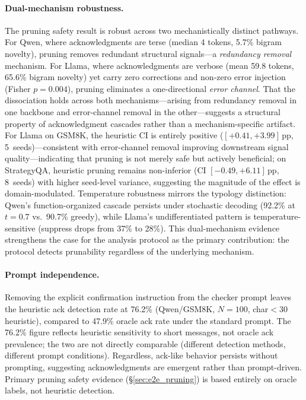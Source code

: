 \paragraph{Dual-mechanism robustness.}
The pruning safety result is robust across two mechanistically distinct pathways. For Qwen, where acknowledgments are terse (median 4 tokens, 5.7\% bigram novelty), pruning removes redundant structural signals---a \emph{redundancy removal} mechanism. For Llama, where acknowledgments are verbose (mean 59.8 tokens, 65.6\% bigram novelty) yet carry zero corrections and non-zero error injection (Fisher $p = 0.004$), pruning eliminates a one-directional \emph{error channel}. That the dissociation holds across both mechanisms---arising from redundancy removal in one backbone and error-channel removal in the other---suggests a structural property of acknowledgment cascades rather than a mechanism-specific artifact. For Llama on GSM8K, the heuristic CI is entirely positive ($[+0.41, +3.99]$\,pp, 5~seeds)---consistent with error-channel removal improving downstream signal quality---indicating that pruning is not merely safe but actively beneficial; on StrategyQA, heuristic pruning remains non-inferior (CI $[-0.49, +6.11]$\,pp, 8~seeds) with higher seed-level variance, suggesting the magnitude of the effect is domain-modulated. Temperature robustness mirrors the typology distinction: Qwen's function-organized cascade persists under stochastic decoding (92.2\% at $t{=}0.7$ vs.\ 90.7\% greedy), while Llama's undifferentiated pattern is temperature-sensitive (suppress drops from 37\% to 28\%). This dual-mechanism evidence strengthens the case for the analysis protocol as the primary contribution: the protocol detects prunability regardless of the underlying mechanism.

\paragraph{Prompt independence.}
Removing the explicit confirmation instruction from the checker prompt leaves the heuristic ack detection rate at 76.2\% (Qwen/GSM8K, $N{=}100$, char$<$30 heuristic), compared to 47.9\% oracle ack rate under the standard prompt. The 76.2\% figure reflects heuristic sensitivity to short messages, not oracle ack prevalence; the two are not directly comparable (different detection methods, different prompt conditions). Regardless, ack-like behavior persists without prompting, suggesting acknowledgments are emergent rather than prompt-driven. Primary pruning safety evidence (\S\ref{sec:e2e_pruning}) is based entirely on oracle labels, not heuristic detection.

